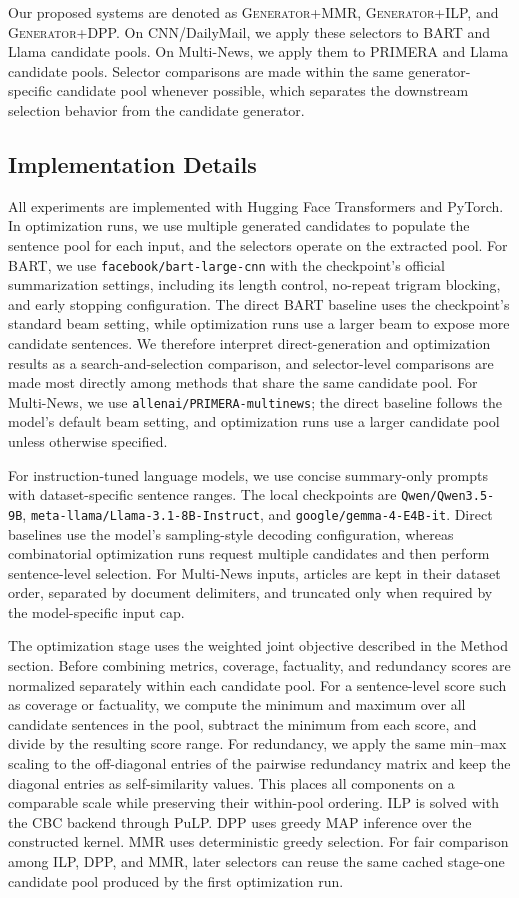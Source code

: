 \documentclass[11pt]{article}
\begin{document}
Our proposed systems are denoted as \textsc{Generator}+MMR, \textsc{Generator}+ILP, and \textsc{Generator}+DPP. On CNN/DailyMail, we apply these selectors to BART and Llama candidate pools. On Multi-News, we apply them to PRIMERA and Llama candidate pools. Selector comparisons are made within the same generator-specific candidate pool whenever possible, which separates the downstream selection behavior from the candidate generator.

\subsection{Implementation Details}
All experiments are implemented with Hugging Face Transformers and PyTorch. In optimization runs, we use multiple generated candidates to populate the sentence pool for each input, and the selectors operate on the extracted pool. For BART, we use \texttt{facebook/bart-large-cnn} with the checkpoint's official summarization settings, including its length control, no-repeat trigram blocking, and early stopping configuration. The direct BART baseline uses the checkpoint's standard beam setting, while optimization runs use a larger beam to expose more candidate sentences. We therefore interpret direct-generation and optimization results as a search-and-selection comparison, and selector-level comparisons are made most directly among methods that share the same candidate pool. For Multi-News, we use \texttt{allenai/PRIMERA-multinews}; the direct baseline follows the model's default beam setting, and optimization runs use a larger candidate pool unless otherwise specified.

For instruction-tuned language models, we use concise summary-only prompts with dataset-specific sentence ranges. The local checkpoints are \texttt{Qwen/Qwen3.5-9B}, \texttt{meta-llama/Llama-3.1-8B-Instruct}, and \texttt{google/gemma-4-E4B-it}. Direct baselines use the model's sampling-style decoding configuration, whereas combinatorial optimization runs request multiple candidates and then perform sentence-level selection. For Multi-News inputs, articles are kept in their dataset order, separated by document delimiters, and truncated only when required by the model-specific input cap.

The optimization stage uses the weighted joint objective described in the Method section. Before combining metrics, coverage, factuality, and redundancy scores are normalized separately within each candidate pool. For a sentence-level score such as coverage or factuality, we compute the minimum and maximum over all candidate sentences in the pool, subtract the minimum from each score, and divide by the resulting score range. For redundancy, we apply the same min--max scaling to the off-diagonal entries of the pairwise redundancy matrix and keep the diagonal entries as self-similarity values. This places all components on a comparable scale while preserving their within-pool ordering. ILP is solved with the CBC backend through PuLP. DPP uses greedy MAP inference over the constructed kernel. MMR uses deterministic greedy selection. For fair comparison among ILP, DPP, and MMR, later selectors can reuse the same cached stage-one candidate pool produced by the first optimization run.
\end{document}
